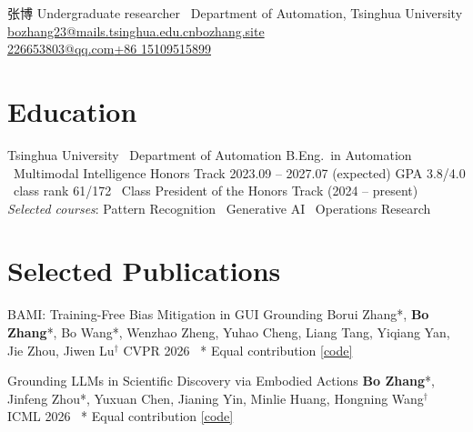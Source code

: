 \documentclass[10pt]{article}
\begin{document}
%
  {张博}%
  {Undergraduate researcher \cvsep\ Department of Automation, Tsinghua University}%
  {%
    \cvicon{\faEnvelope[regular]}\href{mailto:bo-zhang23@mails.tsinghua.edu.cn}{bozhang23@mails.tsinghua.edu.cn}\quad\cvicon{\faGlobe}\href{https://bozhang.site}{bozhang.site}\\%
    \cvicon{\faGithub}\href{mailto:226653803@qq.com}{226653803@qq.com}\quad\cvicon{\faPhone}\href{tel:+8615109515899}{+86 15109515899}%
  }

\section{Education}

\cventry%
  {Tsinghua University \cvsep\ Department of Automation}%
  {B.Eng.\ in Automation \cvsep\ Multimodal Intelligence Honors Track}%
  {2023.09 -- 2027.07 (expected)}%
  {%
    GPA 3.8/4.0 \cvsep\ class rank 61/172 \cvsep\ Class President of the Honors Track (2024 -- present)\\
    {\itshape Selected courses}: Pattern Recognition \cvsep\ Generative AI \cvsep\ Operations Research%
  }

\section{Selected Publications}


\cvpub%
  {{BAMI}: Training-Free Bias Mitigation in {GUI} Grounding}%
  {Borui Zhang*, \textbf{Bo Zhang}*, Bo Wang*, Wenzhao Zheng, Yuhao Cheng, Liang Tang, Yiqiang Yan, Jie Zhou, Jiwen Lu$^\dagger$}%
  {CVPR 2026 \cvsep\ {*} Equal contribution}%
  {\href{https://github.com/Neur-IO/BAMI}{[code]}}


\cvpub%
  {Grounding {LLMs} in Scientific Discovery via Embodied Actions}%
  {\textbf{Bo Zhang}*, Jinfeng Zhou*, Yuxuan Chen, Jianing Yin, Minlie Huang, Hongning Wang$^\dagger$}%
  {ICML 2026 \cvsep\ {*} Equal contribution}%
  {\href{https://anonymous.4open.science/r/EmbodiedAct}{[code]}}
\end{document}
